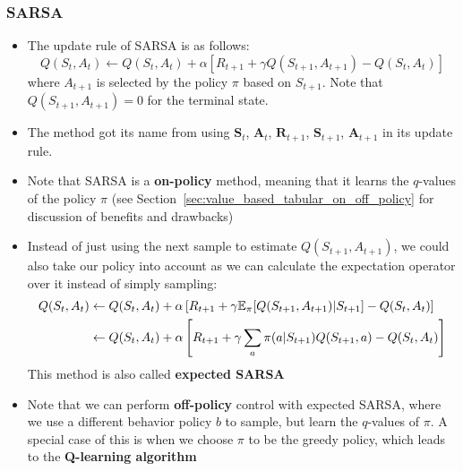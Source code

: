 \subsubsection{SARSA}
\begin{itemize}
	\item The update rule of SARSA is as follows:
	$$Q(S_t,A_t)\leftarrow Q(S_t,A_t) + \alpha\left[R_{t+1}+\gamma Q(S_{t+1},A_{t+1})-Q(S_t,A_t)\right]$$
	where $A_{t+1}$ is selected by the policy $\pi$ based on $S_{t+1}$. Note that $Q(S_{t+1},A_{t+1})=0$ for the terminal state.
	\item The method got its name from using $\bm{S}_t$, $\bm{A}_t$, $\bm{R}_{t+1}$, $\bm{S}_{t+1}$, $\bm{A}_{t+1}$ in its update rule.
	\item Note that SARSA is a \textbf{on-policy} method, meaning that it learns the $q$-values of the policy $\pi$ (see Section~\ref{sec:value_based_tabular_on_off_policy} for discussion of benefits and drawbacks)
	\item Instead of just using the next sample to estimate $Q(S_{t+1},A_{t+1})$, we could also take our policy into account as we can calculate the expectation operator over it instead of simply sampling:
	\begin{equation*}
		\begin{split}
			Q(S_t,A_t) & \leftarrow Q(S_t,A_t) + \alpha\left[R_{t+1}+\gamma \mathbb{E}_{\pi}[Q(S_{t+1},A_{t+1})|S_{t+1}]-Q(S_t,A_t)\right]\\
			& \leftarrow Q(S_t,A_t) + \alpha\left[R_{t+1}+\gamma \sum_{a} \pi(a|S_{t+1}) Q(S_{t+1},a)-Q(S_t,A_t)\right]
		\end{split}
	\end{equation*}
	This method is also called \textbf{expected SARSA}
	\item Note that we can perform \textbf{off-policy} control with expected SARSA, where we use a different behavior policy $b$ to sample, but learn the $q$-values of $\pi$. A special case of this is when we choose $\pi$ to be the greedy policy, which leads to the \textbf{Q-learning algorithm}
\end{itemize}

